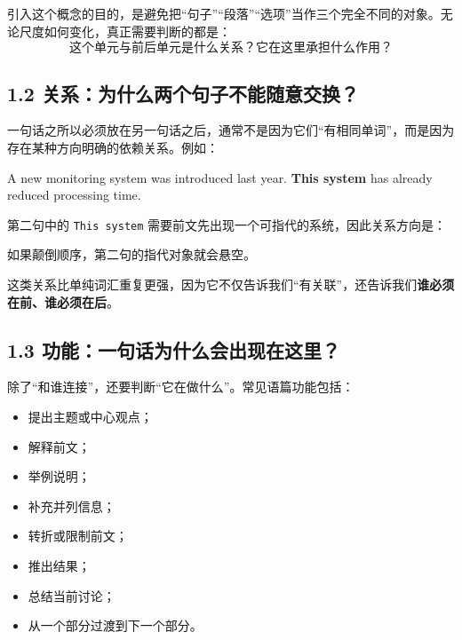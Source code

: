 \documentclass[11pt,a4paper]{ctexart}
\newcommand{\kw}[1]{\textbf{#1}}
\begin{document}
引入这个概念的目的，是避免把“句子”“段落”“选项”当作三个完全不同的对象。无论尺度如何变化，真正需要判断的都是：
\[
\boxed{\text{这个单元与前后单元是什么关系？它在这里承担什么作用？}}
\]

\subsection{1.2 关系：为什么两个句子不能随意交换？}
一句话之所以必须放在另一句话之后，通常不是因为它们“有相同单词”，而是因为存在某种方向明确的依赖关系。例如：
\begin{eng}[例 1：指代造成方向约束]
A new monitoring system was introduced last year. \textbf{This system} has already reduced processing time.
\end{eng}
第二句中的 \texttt{This system} 需要前文先出现一个可指代的系统，因此关系方向是：
\begin{center}
\end{center}
如果颠倒顺序，第二句的指代对象就会悬空。

这类关系比单纯词汇重复更强，因为它不仅告诉我们“有关联”，还告诉我们\kw{谁必须在前、谁必须在后}。

\subsection{1.3 功能：一句话为什么会出现在这里？}
除了“和谁连接”，还要判断“它在做什么”。常见语篇功能包括：
\begin{itemize}
  \item 提出主题或中心观点；
  \item 解释前文；
  \item 举例说明；
  \item 补充并列信息；
  \item 转折或限制前文；
  \item 推出结果；
  \item 总结当前讨论；
  \item 从一个部分过渡到下一个部分。
\end{itemize}
\end{document}
